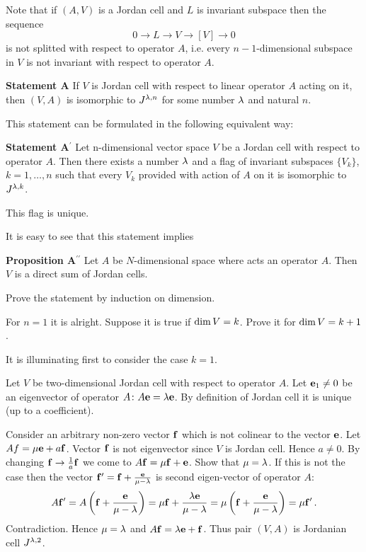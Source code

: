    Note that if $(A,V)$ is a Jordan cell and $L$ is invariant subspace
then  the sequence
        $$
    0\rightarrow L\rightarrow V\rightarrow [V]\rightarrow 0
        $$
is not splitted with respect to operator $A$, i.e. every $n-1$-dimensional
subspace in $V$ is not invariant with respect to operator $A$.

\m

 {\bf Statement A} If $V$ is Jordan cell with respect to 
linear operator $A$ acting on it, then
 $(V,A)$ is isomorphic to $J^{\lambda,n}$  for some number $\lambda$ and natural $n$.


 \m
 
 This statement can be formulated in the following equivalent way:

  {\bf Statement A$^\prime$}  Let n-dimensional vector space $V$ 
be a Jordan cell with respect to operator $A$. 
  Then there exists a number $\lambda$  
  and a flag of invariant subspaces $\{V_k\}$, $k=1,\dots,n$  such that  
  every $V_k$ provided with action   of $A$ on it is isomorphic to $J^{\lambda,k}$.
  
  This flag is unique.
  
   It is easy to see that this statement implies 

{\bf Proposition A$^{\prime\prime}$}  Let $A$ be $N$-dimensional 
space where acts an operator $A$. Then
       $V$ is a direct sum of Jordan cells.

   \m
   
   
   Prove the statement by induction on dimension.
   
   For $n=1$ it is alright. Suppose it is true if ${\rm dim\,}V=k$. 
     Prove it for
   ${\rm dim\,}V=k+1$.   

  It is illuminating first to consider  the case $k=1$.
   
   Let $V$ be two-dimensional Jordan cell with respect to operator $A$.
  Let ${\bf e}_1\not=0$ be an eigenvector of operator $A\colon A{\bf e}=\lambda{\bf e}$.
 By definition of Jordan cell it is unique (up to  a coefficient).


  Consider an arbitrary non-zero vector ${\bf f}$ which is not 
  colinear to the vector ${\bf e}$.
  Let $Af=\mu {\bf e}+a{\bf f}$. Vector ${\bf f}$ is not eigenvector since 
  $V$ is Jordan cell. Hence $a\not=0$.
  By changing ${\bf f}\to {1\over a}{\bf f}$ we come to $A{\bf f}=\mu{\bf f}+{\bf e}$. 
  Show that $\mu=\lambda$. If this is not the case then
 the vector ${\bf f}'={\bf f}+{{\bf e}\over \mu-\lambda}$ 
is second eigen-vector of operator $A$:
           $$
  A{\bf f}'= A\left({\bf f}+{{\bf e}\over \mu-\lambda}\right)=\mu{\bf f}+{\lambda{\bf e}\over\mu-\lambda}=
      \mu\left({\bf f}+{{\bf e}\over \mu-\lambda}\right)=\mu{\bf f}'\,.
      $$
 Contradiction. Hence $\mu=\lambda$ and $A{\bf f}=\lambda{\bf e}+{\bf f}$.
Thus pair $(V,A)$ is Jordanian cell $J^{\lambda,2}$.


